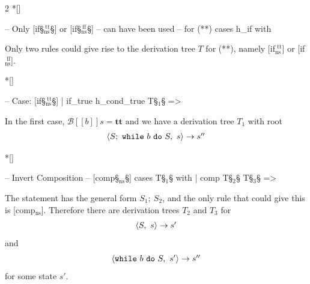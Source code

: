 \begin{paracol}{2}
\switchcolumn[1]*[]
\begin{leftcolumn}
    \begin{Lean_Code}
  -- Only [if§\color{green!40!black}$_{\text{ns}}^{\ \text{tt}}$§] or [if§\color{green!40!black}$_{\text{ns}}^{\ \text{ff}}$§]
  -- can have been used
  -- for (**)
  cases h_if with
    \end{Lean_Code}
\end{leftcolumn}
\begin{rightcolumn} \noindent
Only two rules could give rise to the derivation tree \(T\) for (**), namely
[if$_{\text{ns}}^{\text{\ tt}}$] or [if$_{\text{ns}}^{\text{\ ff}}$].
\end{rightcolumn}
\vspace{1.5em}

\switchcolumn[1]*[]
\begin{leftcolumn}
    \begin{Lean_Code}
  -- Case: [if§\color{green!40!black}$_{\text{ns}}^{\ \text{tt}}$§]
  | if_true
    h_cond_true T§$_1$§ =>
    \end{Lean_Code}
\end{leftcolumn}
\begin{rightcolumn} \noindent
In the first case, \(\mathcal{B}[\![b]\!]s = \mathbf{tt}\) and we have a derivation tree \(T_1\)
with root
\[
    \begin{prooftree}
        \hypo{\langle S;\ \mathtt{while}\ b\ \mathtt{do}\ S,\ s\rangle \to s''}
    \end{prooftree}
\]
\end{rightcolumn}
\vspace{1.5em}

\switchcolumn[1]*[]
\begin{leftcolumn}
    \begin{Lean_Code}
    -- Invert Composition
    -- [comp§\color{green!40!black}$_{\text{ns}}$§]
    cases T§$_1$§ with
    | comp T§$_2$§ T§$_3$§ =>
    \end{Lean_Code}
\end{leftcolumn}
\begin{rightcolumn} \noindent
The statement has the general form \(S_1;\ S_2\), and the only rule that could give
this is [comp$_{\text{ns}}$]. Therefore there are derivation trees \(T _2\) and \(T_3\) for
\[
    \begin{prooftree}
        \hypo{\langle S,\ s\rangle \to s'}
    \end{prooftree}
\]
and
\[
    \begin{prooftree}
        \hypo{\langle \mathtt{while}\ b\ \mathtt{do}\ S,\ s'\rangle \to s''}
    \end{prooftree}
\]
for some state \(s'\).
\end{rightcolumn}
\vspace{1.5em}


\end{paracol}
